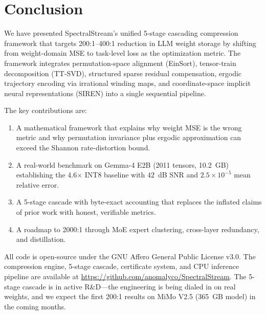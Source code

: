 \documentclass[11pt,a4paper]{article}
\begin{document}
\section{Conclusion}

We have presented SpectralStream's unified 5-stage cascading compression framework
that targets 200:1--400:1 reduction in LLM weight storage by shifting from
weight-domain MSE to task-level loss as the optimization metric. The framework
integrates permutation-space alignment (EinSort), tensor-train decomposition
(TT-SVD), structured sparse residual compensation, ergodic trajectory encoding
via irrational winding maps, and coordinate-space implicit neural representations
(SIREN) into a single sequential pipeline.

The key contributions are:

\begin{enumerate}
	\item A mathematical framework that explains why weight MSE is the wrong metric
	      and why permutation invariance plus ergodic approximation can exceed the
	      Shannon rate-distortion bound.
	\item A real-world benchmark on Gemma-4 E2B (2011 tensors, 10.2~GB) establishing
	      the 4.6$\times$ INT8 baseline with $42$~dB SNR and $2.5 \times 10^{-5}$
	      mean relative error.
	\item A 5-stage cascade with byte-exact accounting that replaces the inflated
	      claims of prior work with honest, verifiable metrics.
	\item A roadmap to 2000:1 through MoE expert clustering, cross-layer redundancy,
	      and distillation.
\end{enumerate}

All code is open-source under the GNU Affero General Public License v3.0. The
compression engine, 5-stage cascade, certificate system, and CPU inference pipeline
are available at \url{https://github.com/anomalyco/SpectralStream}. The 5-stage
cascade is in active R\&D---the engineering is being dialed in on real weights,
and we expect the first 200:1 results on MiMo V2.5 (365~GB model) in the coming
months.

\end{document}
